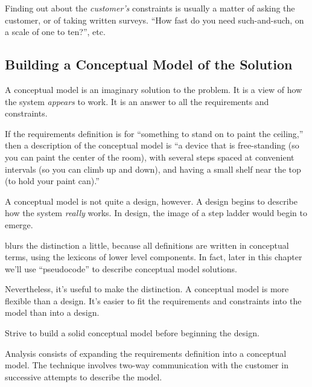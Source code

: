 Finding out about the \emph{customer's} constraints%
is usually a matter of asking the customer, or of taking written
surveys. ``How fast do you need such-and-such, on a scale of one to
ten?'', etc.%
%

\subsection{Building a Conceptual Model of the Solution}%
%

A conceptual model is an imaginary solution to the problem. It is a
view of how the system \emph{appears} to work. It is an answer to all
the requirements and constraints.%


If the requirements definition is for ``something to stand on to paint
the ceiling,'' then a description of the conceptual model is ``a
device that is free-standing (so you can paint the center of the
room), with several steps spaced at convenient intervals (so you can
climb up and down), and having a small shelf near the top (to hold
your paint can).''

A conceptual model is not quite a design, however. A design begins to
describe how the system \emph{really} works. In design, the image of a
step ladder would begin to emerge.

\Forth{} blurs the distinction a little, because all definitions are
written in conceptual terms, using the lexicons of lower level
components. In fact, later in this chapter we'll use \Forth{}
``pseudocode'' to describe conceptual model solutions.

Nevertheless, it's useful to make the distinction. A conceptual model
is more flexible than a design. It's easier to fit the requirements
and constraints into the model than into a design.

\begin{tip}
Strive to build a solid conceptual model before beginning the design.
\end{tip}


\noindent Analysis consists of expanding the requirements definition
into a conceptual model. The technique involves two-way communication
with the customer in successive attempts to describe the model.

